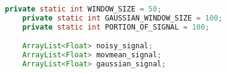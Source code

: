 \begin{lstlisting}[language=Java,  basicstyle=\footnotesize]
 	private static int WINDOW_SIZE = 50;
	private static int GAUSSIAN_WINDOW_SIZE = 100;
	private static int PORTION_OF_SIGNAL = 100;

	ArrayList<Float> noisy_signal;	
	ArrayList<Float> movmean_signal;
	ArrayList<Float> gaussian_signal;
\end{lstlisting}